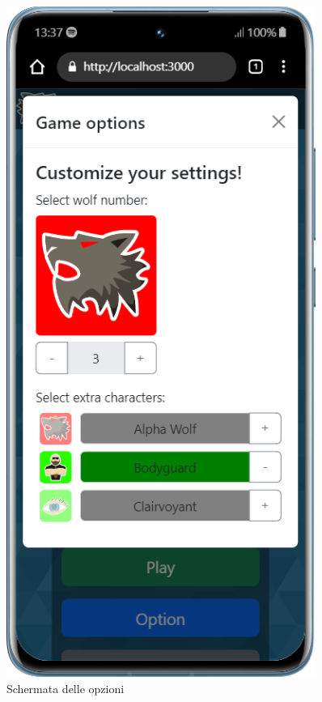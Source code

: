 \begin{figure}[H]
\begin{minipage}{0.45\textwidth}
    \end{minipage}\hfill
    \begin{minipage}{0.45\textwidth}
        \centering
        \includegraphics[width=0.9\textwidth]{img/screen/mobile/option_mobile.png}
        \caption{Schermata delle opzioni}
        \label{fig:option_mobile}
    \end{minipage}
\end{figure}

